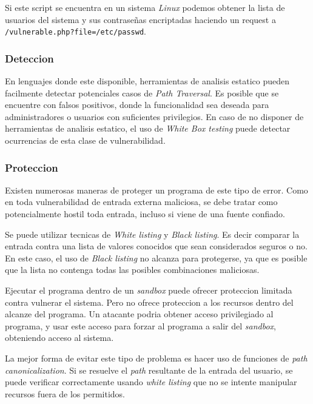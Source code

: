 Si este script se encuentra en un sistema \textit{Linux} podemos obtener la lista de usuarios del sistema y sus contraseñas encriptadas haciendo un request a \texttt{/vulnerable.php?file=/etc/passwd}.

\subsubsection{Deteccion}

En lenguajes donde este disponible, herramientas de analisis estatico pueden facilmente detectar potenciales casos de \textit{Path Traversal}. Es posible que se encuentre con falsos positivos, donde la funcionalidad sea deseada para administradores o usuarios con suficientes privilegios.
En caso de no disponer de herramientas de analisis estatico, el uso de \textit{White Box testing} puede detectar ocurrencias de esta clase de vulnerabilidad.

\subsubsection{Proteccion}

Existen numerosas maneras de proteger un programa de este tipo de error. 
Como en toda vulnerabilidad de entrada externa maliciosa, se debe tratar como potencialmente hostil toda entrada, incluso si viene de una fuente confiado.

Se puede utilizar tecnicas de \textit{White listing} y \textit{Black listing}.
Es decir comparar la entrada contra una lista de valores conocidos que sean considerados seguros o no.
En este caso, el uso de \textit{Black listing} no alcanza para protegerse, ya que es posible que la lista no contenga todas las posibles combinaciones maliciosas.

Ejecutar el programa dentro de un \textit{sandbox} puede ofrecer proteccion limitada contra vulnerar el sistema.
Pero no ofrece proteccion a los recursos dentro del alcanze del programa.
Un atacante podria obtener acceso privilegiado al programa, y usar este acceso para forzar al programa a salir del \textit{sandbox}, obteniendo acceso al sistema.

La mejor forma de evitar este tipo de problema es hacer uso de funciones de \textit{path canonicalization}.
Si se resuelve el \textit{path} resultante de la entrada del usuario, se puede verificar correctamente usando \textit{white listing} que no se intente manipular recursos fuera de los permitidos.


